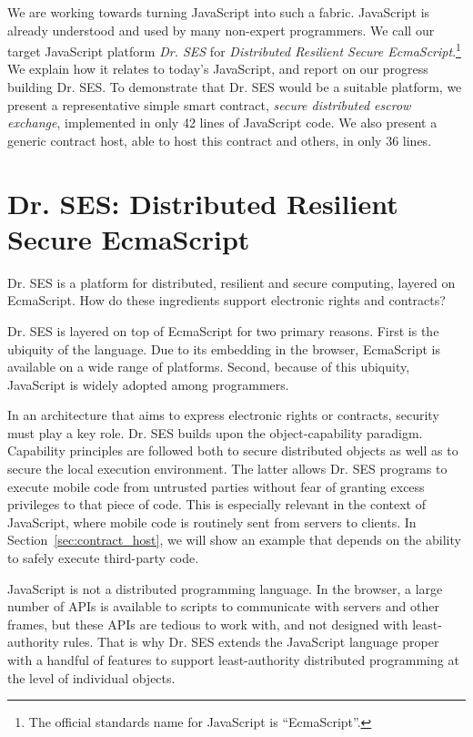 \documentclass{llncs}
\begin{document}
We are working towards turning JavaScript into such a fabric. JavaScript is already understood and used by many non-expert programmers. We call our target JavaScript platform \emph{Dr. SES} for \emph{Distributed Resilient Secure EcmaScript}.\footnote{
%
The official standards name for JavaScript is ``EcmaScript''.
%
} We explain how it relates to today's JavaScript, and report on our progress building Dr. SES. To demonstrate that Dr. SES would be a suitable platform, we present a representative simple smart contract, \emph{secure distributed escrow exchange}, implemented in only 42 lines of JavaScript code. We also present a generic contract host, able to host this contract and others, in only 36 lines.

\section{Dr. SES: Distributed Resilient Secure EcmaScript}

Dr. SES is a platform for distributed, resilient and secure computing, layered on EcmaScript. How do these ingredients support electronic rights and contracts?

Dr. SES is layered on top of EcmaScript for two primary reasons. First is the ubiquity of the language. Due to its embedding in the browser, EcmaScript is available on a wide range of platforms. Second, because of this ubiquity, JavaScript is widely adopted among programmers.

In an architecture that aims to express electronic rights or contracts, security must play a key role. Dr. SES builds upon the object-capability paradigm. Capability principles are followed both to secure distributed objects as well as to secure the local execution environment. The latter allows Dr. SES programs to execute mobile code from untrusted parties without fear of granting excess privileges to that piece of code. This is especially relevant in the context of JavaScript, where mobile code is routinely sent from servers to clients. In Section~\ref{sec:contract_host}, we will show an example that  depends on the ability to safely execute third-party code.

JavaScript is not a distributed programming language. In the browser, a large number of APIs is available to scripts to communicate with servers and other frames, but these APIs are tedious to work with, and not designed with least-authority rules. That is why Dr. SES extends the JavaScript language proper with a handful of features to support least-authority distributed programming at the level of individual objects.
\end{document}
